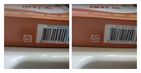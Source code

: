 \begin{figure}[h]
\begin{minipage}{0.15\textwidth}
    \end{minipage}
    \begin{minipage}{0.15\textwidth}
        \centering
        \includegraphics[width=\linewidth]{material/1k/374.png}
    \end{minipage}
    \begin{minipage}{0.15\textwidth}
        \centering
        \includegraphics[width=\linewidth]{material/8k/374.png}

\end{minipage}
\end{figure}
